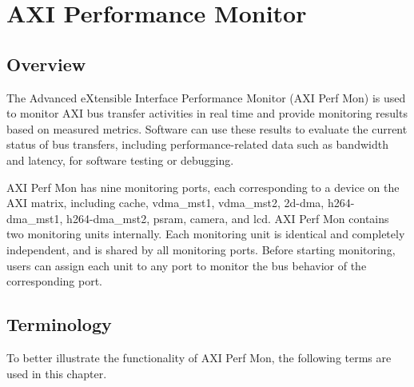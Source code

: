 \documentclass[main\_\_EN.tex]{subfiles}
\begin{document}
\setenglishformatting

\ifglobal
\else
    \clearpage
    \listoftodos
    \listofdonetodos
    \tableofcontents
\fi



\hypertarget{aximon}{}
\chapter{AXI Performance Monitor}
\label{mod:aximon}


\section{Overview}
\label{sec:aximon-overview}

The Advanced eXtensible Interface Performance Monitor (AXI Perf Mon) is used to monitor AXI bus transfer activities in real time and provide monitoring results based on measured metrics. Software can use these results to evaluate the current status of bus transfers, including performance-related data such as bandwidth and latency, for software testing or debugging.

AXI Perf Mon has nine monitoring ports, each corresponding to a device on the AXI matrix, including cache, vdma\_mst1, vdma\_mst2, 2d-dma, h264-dma\_mst1, h264-dma\_mst2, psram, camera, and lcd. AXI Perf Mon contains two monitoring units internally. Each monitoring unit is identical and completely independent, and is shared by all monitoring ports. Before starting monitoring, users can assign each unit to any port to monitor the bus behavior of the corresponding port.




\section{Terminology}
\label{sec:aximon-term}

To better illustrate the functionality of AXI Perf Mon, the following terms are used in this chapter.
\end{document}
